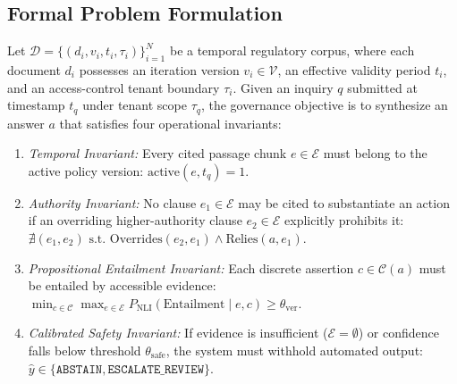 \documentclass[journal,twoside]{IEEEtran}
\begin{document}
\subsection{Formal Problem Formulation}
Let $\mathcal{D} = \{ (d_i, v_i, t_i, \tau_i) \}_{i=1}^N$ be a temporal regulatory corpus, where each document $d_i$ possesses an iteration version $v_i \in \mathcal{V}$, an effective validity period $t_i$, and an access-control tenant boundary $\tau_i$.
Given an inquiry $q$ submitted at timestamp $t_q$ under tenant scope $\tau_q$, the governance objective is to synthesize an answer $a$ that satisfies four operational invariants:
\begin{enumerate}
  \item \emph{Temporal Invariant:} Every cited passage chunk $e \in \mathcal{E}$ must belong to the active policy version: $\text{active}(e, t_q) = 1$.
  \item \emph{Authority Invariant:} No clause $e_1 \in \mathcal{E}$ may be cited to substantiate an action if an overriding higher-authority clause $e_2 \in \mathcal{E}$ explicitly prohibits it: $\nexists (e_1, e_2) \text{ s.t. } \text{Overrides}(e_2, e_1) \land \text{Relies}(a, e_1)$.
  \item \emph{Propositional Entailment Invariant:} Each discrete assertion $c \in \mathcal{C}(a)$ must be entailed by accessible evidence: $\min_{c \in \mathcal{C}} \max_{e \in \mathcal{E}} P_{\text{NLI}}(\text{Entailment} \mid e, c) \geq \theta_{\text{ver}}$.
  \item \emph{Calibrated Safety Invariant:} If evidence is insufficient ($\mathcal{E} = \emptyset$) or confidence falls below threshold $\theta_{\text{safe}}$, the system must withhold automated output: $\hat{y} \in \{\texttt{ABSTAIN}, \texttt{ESCALATE\_REVIEW}\}$.
\end{enumerate}
\end{document}
